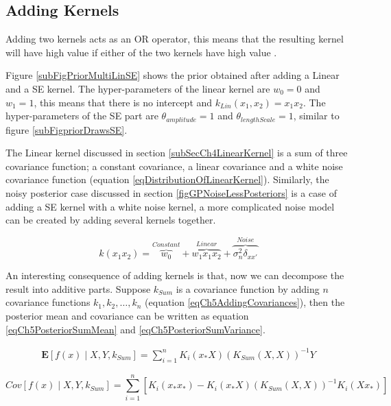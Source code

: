 \subsection{Adding Kernels} \label{subsecStructureKernelsAddingKernels}
Adding two kernels acts as an OR operator, this means that the resulting kernel will have high value if either of the two kernels have high value \cite{durrande2011additive}. 

Figure \ref{subFigPriorMultiLinSE} shows the prior obtained after adding a Linear and a SE kernel. The hyper-parameters of the linear kernel are $w_{0}=0$ and $w_{1}=1$, this means that there is no intercept and $k_{Lin}(x_{1}, x_{2}) = x_{1}x_{2}$. The hyper-parameters of the SE part are $\theta_{amplitude}=1$ and $\theta_{lengthScale}=1$, similar to figure \ref{subFigpriorDrawsSE}. 

The Linear kernel discussed in section \ref{subSecCh4LinearKernel} is a sum of three covariance function; a constant covariance, a linear covariance and a white noise covariance function (equation \ref{eqDistributionOfLinearKernel}). Similarly, the noisy posterior case discussed in section \ref{figGPNoiseLessPosteriors} is a case of adding a SE kernel with a white noise kernel, a more complicated noise model can be created by adding several kernels together.

\begin{equation}\label{eqDistributionOfLinearKernel}
k(x_{1}x_{2}) = \overbrace{w_{0}}^{Constant} + \overbrace{w_{1}x_{1}x_{2}}^{Linear} + \overbrace{\sigma_{n}^2\delta_{xx'}}^{Noise}
\end{equation}

An interesting consequence of adding kernels is that, now we can decompose the result into additive parts. Suppose $k_{Sum}$ is a covariance function by adding $n$ covariance functions $k_{1}, k_{2}, \ldots, k_{n}$ (equation \ref{eqCh5AddingCovariances}), then the posterior mean and covariance can be written as equation \ref{eqCh5PosteriorSumMean} and \ref{eqCh5PosteriorSumVariance}. 

\begin{align}\label{eqCh5PosteriorSumMean}
\mathbf{E}[f(x) \mid X, Y, k_{Sum}] = \sum_{i=1}^{n} K_{i}(x_{*}X)( K_{Sum}(X, X))^{-1}Y
\end{align}

\begin{equation}\label{eqCh5PosteriorSumVariance}
Cov[f(x) \mid X, Y, k_{Sum}] = \sum_{i=1}^{n} \left[ K_{i}(x_{*}x_{*}) - K_{i}(x_{*}X)( K_{Sum}(X, X) )^{-1}K_{i}(Xx_{*}) \right ]
\end{equation}

